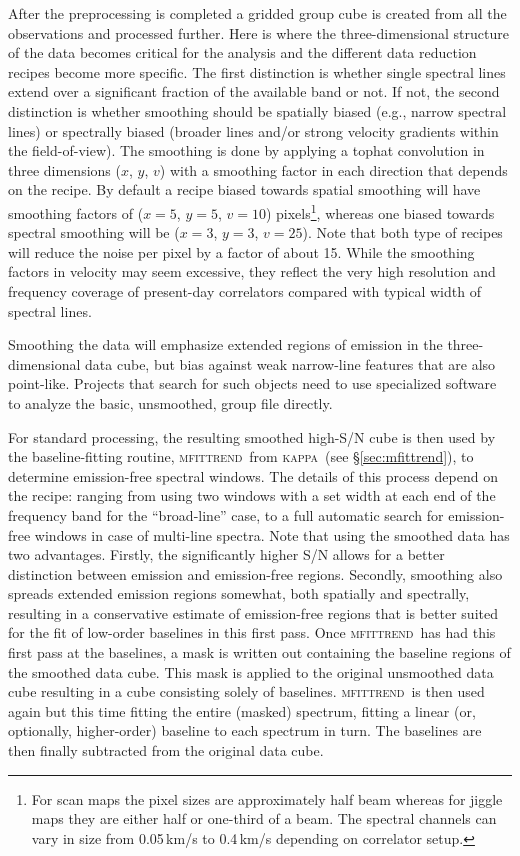 \documentclass[a4paper,fleqn,usenatbib]{mnras}
\newcommand{\KAPPA}{\textsc{kappa}}
\newcommand{\mfittrend}{\textsc{mfittrend}}
\begin{document}
After the preprocessing is completed a gridded group cube is created
from all the observations and processed further. Here is where the
three-dimensional structure of the data becomes critical for the analysis
and the different data reduction recipes become more specific. The first
distinction is whether single spectral lines extend over a significant
fraction of the available band or not. If not, the second distinction
is whether smoothing should be spatially biased (e.g., narrow spectral
lines) or spectrally biased (broader lines and/or strong velocity
gradients within the field-of-view). The smoothing is done by applying
a tophat convolution in three dimensions ($x$, $y$, $v$) with a smoothing
factor in each direction that depends on the recipe.  By default a
recipe biased towards spatial smoothing will have smoothing factors of
($x=5$, $y=5$, $v=10$) pixels\footnote{For scan maps the pixel sizes
  are approximately half beam whereas for jiggle maps they are either
  half or one-third of a beam. The spectral channels can vary in size
  from 0.05\,km/s to 0.4\,km/s depending on correlator setup.},
 whereas one biased towards spectral smoothing
will be ($x=3$, $y=3$, $v=25$). Note that both type of recipes will reduce
the noise per pixel by a factor of about 15. While the smoothing
factors in velocity may seem excessive, they reflect the very high
resolution and frequency coverage of present-day correlators
compared with typical width of spectral lines.

Smoothing the data will emphasize extended regions of emission in the
three-dimensional data cube, but bias against weak narrow-line features that are also
point-like. Projects that search for such objects need to use specialized
software to analyze the basic, unsmoothed, group file directly.

For standard processing, the resulting smoothed high-S/N cube
is then used by the baseline-fitting routine, \mfittrend\ from
\KAPPA\  (see \S\ref{sec:mfittrend}),
to determine emission-free spectral windows.
The details of this process depend on the recipe: ranging from using two
windows with a set width at each end of the frequency band
for the ``broad-line'' case, to a full automatic search for emission-free
windows in case of multi-line spectra. Note that using the smoothed data has
two advantages. Firstly, the significantly higher S/N allows for a better
distinction between emission and emission-free regions. Secondly, smoothing
also spreads extended emission regions somewhat, both spatially and spectrally,
resulting in a conservative estimate of emission-free regions that is better suited for
the fit of low-order baselines in this first pass. Once \mfittrend\ has
had this first pass at the baselines, a mask is written out containing the
baseline regions of the smoothed data cube. This mask is applied to the original
unsmoothed data cube resulting in a cube consisting solely of
baselines. \mfittrend\ is then used again but this time fitting
the entire (masked) spectrum, fitting a linear (or, optionally, higher-order) baseline
to each spectrum in turn. The baselines are then finally subtracted from the
original data cube.
\end{document}
